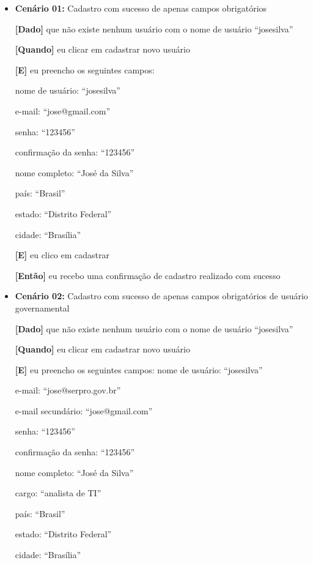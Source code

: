 	\begin{itemize}
	\item\textbf{Cenário 01:} Cadastro com sucesso de apenas campos obrigatórios

	\textbf{[Dado]} que não existe nenhum usuário com o nome de usuário ``josesilva''

	\textbf{[Quando]} eu clicar em cadastrar novo usuário

	\textbf{[E]} eu preencho os seguintes campos: 

  		\subitem nome de usuário: ``josesilva''

  		\subitem e-mail: ``jose@gmail.com''

  		\subitem senha: ``123456''

  		\subitem confirmação da senha: ``123456''

  		\subitem nome completo: ``José da Silva''

  		\subitem país: ``Brasil''

  		\subitem estado: ``Distrito Federal''

  		\subitem cidade: ``Brasília''

	\textbf{[E]} eu clico em cadastrar

	\textbf{[Então]} eu recebo uma confirmação de cadastro realizado com sucesso


	\item\textbf{Cenário 02:} Cadastro com sucesso de apenas campos obrigatórios de usuário governamental
	
	\textbf{[Dado]} que não existe nenhum usuário com o nome de usuário ``josesilva''
	
	\textbf{[Quando]} eu clicar em cadastrar novo usuário
	
	\textbf{[E]} eu preencho os seguintes campos: 
  		\subitem nome de usuário: ``josesilva''

  		\subitem e-mail: ``jose@serpro.gov.br''

  		\subitem e-mail secundário: ``jose@gmail.com''

  		\subitem senha: ``123456''

		\subitem confirmação da senha: ``123456''

		\subitem nome completo: ``José da Silva''

		\subitem cargo: ``analista de TI''

		\subitem país: ``Brasil''

		 \subitem estado: ``Distrito Federal''

		\subitem cidade: ``Brasília''


\end{itemize}
